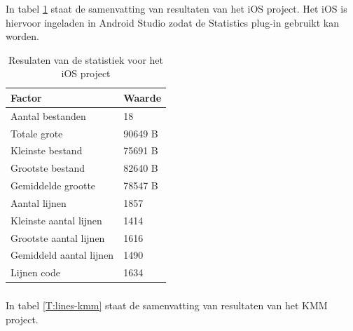 \subsubsection{}
\label{sec:M-test-lijnen-code-ios}
In tabel \ref{T:lines-ios} staat de samenvatting van resultaten van het iOS project. Het iOS is hiervoor ingeladen in Android Studio zodat de Statistics plug-in gebruikt kan worden.

\begin{table}[H]
    \centering
    \caption{Resulaten van de statistiek voor het iOS project}
    \begin{tabular}{|l|l|}
        \hline
        {\textbf{Factor}} & {\textbf{Waarde}} \\ \hline \hline
        Aantal bestanden&18\\ \hline
        Totale grote&90649 B\\ \hline
        Kleinste bestand&75691 B\\ \hline
        Grootste bestand&82640 B\\ \hline
        Gemiddelde grootte&78547 B\\ \hline
        Aantal lijnen&1857\\ \hline
        Kleinste aantal lijnen&1414\\ \hline
        Grootste aantal lijnen&1616\\ \hline
        Gemiddeld aantal lijnen&1490\\ \hline
        Lijnen code&1634\\ \hline
    \end{tabular}
    \label{T:lines-ios}
\end{table}

\subsubsection{}
\label{sec:M-test-lijnen-code-kmm}
In tabel \ref{T:lines-kmm} staat de samenvatting van resultaten van het KMM project.

